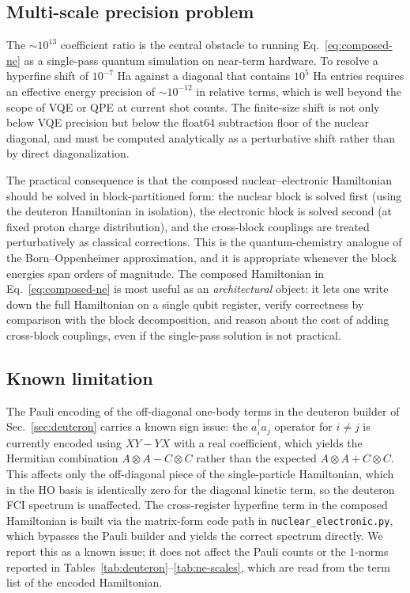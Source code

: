 \documentclass[twocolumn,prc,amsmath,amssymb,superscriptaddress]{revtex4-2}
\begin{document}
\subsection{Multi-scale precision problem}

The $\sim 10^{13}$ coefficient ratio is the central obstacle to
running Eq.~\eqref{eq:composed-ne} as a single-pass quantum simulation
on near-term hardware. To resolve a hyperfine shift of $10^{-7}$ Ha
against a diagonal that contains $10^5$ Ha entries requires an
effective energy precision of $\sim 10^{-12}$ in relative terms,
which is well beyond the scope of VQE or QPE at current shot counts. The
finite-size shift is not only below VQE precision but below the
float$64$ subtraction floor of the nuclear diagonal, and must be
computed analytically as a perturbative shift rather than by direct
diagonalization.

The practical consequence is that the composed nuclear--electronic
Hamiltonian should be solved in block-partitioned form: the nuclear
block is solved first (using the deuteron Hamiltonian in isolation),
the electronic block is solved second (at fixed proton charge
distribution), and the cross-block couplings are treated
perturbatively as classical corrections. This is the quantum-chemistry
analogue of the Born--Oppenheimer approximation, and it is appropriate
whenever the block energies span orders of magnitude. The composed
Hamiltonian in Eq.~\eqref{eq:composed-ne} is most useful as an
\emph{architectural} object: it lets one write down the full
Hamiltonian on a single qubit register, verify correctness by
comparison with the block decomposition, and reason about the cost
of adding cross-block couplings, even if the single-pass solution is
not practical.

\subsection{Known limitation}

The Pauli encoding of the off-diagonal one-body terms in the deuteron
builder of Sec.~\ref{sec:deuteron} carries a known sign issue: the
$a^\dagger_i a_j$ operator for $i \neq j$ is currently encoded using
$XY - YX$ with a real coefficient, which yields the Hermitian
combination $A \otimes A - C \otimes C$ rather than the expected
$A \otimes A + C \otimes C$. This affects only the off-diagonal piece
of the single-particle Hamiltonian, which in the HO basis is
identically zero for the diagonal kinetic term, so the deuteron FCI
spectrum is unaffected. The cross-register hyperfine term in the
composed Hamiltonian is built via the matrix-form code path in
\texttt{nuclear\_electronic.py}, which bypasses the Pauli builder and
yields the correct spectrum directly. We report this as a known issue;
it does not affect the Pauli counts or the $1$-norms reported in
Tables~\ref{tab:deuteron}--\ref{tab:ne-scales}, which are read from
the term list of the encoded Hamiltonian.
\end{document}
